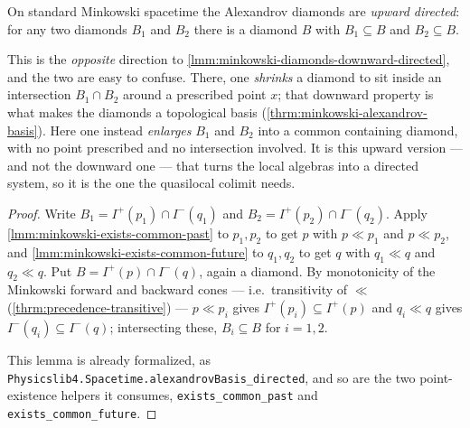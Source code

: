 \begin{lemma}
    \label{lmm:minkowski-diamonds-upward-directed}
    \leanok
    On standard Minkowski spacetime the Alexandrov diamonds are \emph{upward directed}: for any two diamonds $B_1$ and $B_2$ there is a diamond $B$ with $B_1 \subseteq B$ and $B_2 \subseteq B$.

    This is the \emph{opposite} direction to \ref{lmm:minkowski-diamonds-downward-directed}, and the two are easy to confuse. There, one \emph{shrinks} a diamond to sit inside an intersection $B_1 \cap B_2$ around a prescribed point $x$; that downward property is what makes the diamonds a topological basis (\ref{thrm:minkowski-alexandrov-basis}). Here one instead \emph{enlarges} $B_1$ and $B_2$ into a common containing diamond, with no point prescribed and no intersection involved. It is this upward version --- and not the downward one --- that turns the local algebras into a directed system, so it is the one the quasilocal colimit needs.
\end{lemma}
\begin{proof}
    \leanok
    Write $B_1 = I^+(p_1) \cap I^-(q_1)$ and $B_2 = I^+(p_2) \cap I^-(q_2)$. Apply \ref{lmm:minkowski-exists-common-past} to $p_1, p_2$ to get $p$ with $p \ll p_1$ and $p \ll p_2$, and \ref{lmm:minkowski-exists-common-future} to $q_1, q_2$ to get $q$ with $q_1 \ll q$ and $q_2 \ll q$. Put $B = I^+(p) \cap I^-(q)$, again a diamond. By monotonicity of the Minkowski forward and backward cones --- i.e.\ transitivity of $\ll$ (\ref{thrm:precedence-transitive}) --- $p \ll p_i$ gives $I^+(p_i) \subseteq I^+(p)$ and $q_i \ll q$ gives $I^-(q_i) \subseteq I^-(q)$; intersecting these, $B_i \subseteq B$ for $i = 1, 2$.

    This lemma is already formalized, as \texttt{Physicslib4.Spacetime.alexandrovBasis\_directed}, and so are the two point-existence helpers it consumes, \texttt{exists\_common\_past} and \texttt{exists\_common\_future}.
\end{proof}

